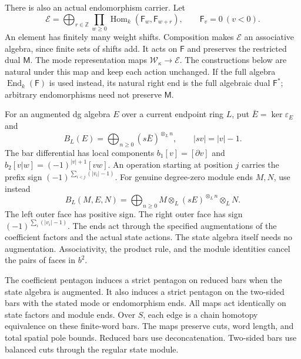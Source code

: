 There is also an actual endomorphism carrier.  Let
\[
 \mathscr E=\bigoplus_{r\in\mathbb Z}
       \prod_{w\ge0}\operatorname{Hom}_k(\mathsf F_w,\mathsf F_{w+r}),
 \qquad\mathsf F_v=0\ (v<0).
\]
An element has finitely many weight shifts.  Composition makes
\(\mathscr E\) an associative algebra, since finite sets of
shifts add.  It acts on \(\mathsf F\) and preserves the
restricted dual \(\mathsf M\).  The mode representation maps
\(\mathscr W_\kappa\to\mathscr E\).  The constructions below
are natural under this map and keep each action unchanged.
If the full algebra \(\operatorname{End}_k(\mathsf F)\) is
used instead, its natural right end is the full algebraic dual
\(\mathsf F^*\); arbitrary endomorphisms need not preserve
\(\mathsf M\).

For an augmented dg algebra \(E\) over a current endpoint ring
\(L\), put \(\bar E=\ker\varepsilon_E\) and
\[
 B_L(E)=\bigoplus_{n\ge0}(s\bar E)^{\otimes_L n},
 \qquad |sv|=|v|-1.
\]
The bar differential has local components
\(b_1[v]=[\partial v]\) and
\(b_2[v|w]=(-1)^{|v|+1}[vw]\).
An operation starting at position \(j\) carries the prefix sign
\((-1)^{\sum_{i<j}(|v_i|-1)}\).
For genuine degree-zero module ends \(M,N\), use instead
\[
 B_L(M,E,N)=\bigoplus_{n\ge0}
 M\otimes_L(sE)^{\otimes_L n}\otimes_LN.
\]
The left outer face has positive sign.  The right outer face has
sign \((-1)^{\sum_i(|v_i|-1)}\).  The ends act through the
specified augmentations of the coefficient factors and the actual
state actions.  The state algebra itself needs no augmentation.
Associativity, the product rule, and the module identities cancel
the pairs of faces in \(b^2\).

\begin{theorem}
\label{fp:thm:four-bar-pentagon}
The coefficient pentagon induces a strict pentagon on reduced bars
when the state algebra is augmented.  It also induces a strict
pentagon on the two-sided bars with the stated mode or endomorphism
ends.  All maps act identically on state factors and module ends.
Over \(S\), each edge is a chain homotopy equivalence on these
finite-word bars.  The maps preserve cuts, word length, and total
spatial pole bounds.  Reduced bars use deconcatenation.  Two-sided
bars use balanced cuts through the regular state module.
\end{theorem}

